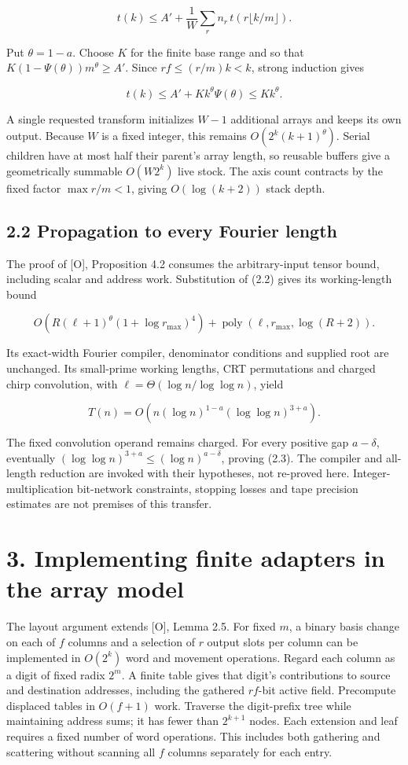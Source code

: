\documentclass[
  11pt,
]{article}
\begin{document}
\[t(k)\le A'+\frac1W\sum_r n_r\,t(r\lfloor k/m\rfloor).
\tag{2.5}\]

Put \(\theta=1-a\). Choose \(K\) for the finite base range and so that
\(K(1-\Psi(\theta))m^\theta\ge A'\). Since \(rf\le(r/m)k<k\), strong
induction gives

\[t(k)\le A'+K k^\theta\Psi(\theta)\le K k^\theta.\]

A single requested transform initializes \(W-1\) additional arrays and
keeps its own output. Because \(W\) is a fixed integer, this remains
\(O(2^k(k+1)^\theta)\). Serial children have at most half their parent's
array length, so reusable buffers give a geometrically summable
\(O(W2^k)\) live stock. The axis count contracts by the fixed factor
\(\max r/m<1\), giving \(O(\log(k+2))\) stack depth.

\subsection{2.2 Propagation to every Fourier
length}\label{propagation-to-every-fourier-length}

The proof of {[}O{]}, Proposition 4.2 consumes the arbitrary-input
tensor bound, including scalar and address work. Substitution of (2.2)
gives its working-length bound

\[O\!\left(R(\ell+1)^\theta(1+\log r_{\max})^4\right)
+\operatorname{poly}(\ell,r_{\max},\log(R+2)).\]

Its exact-width Fourier compiler, denominator conditions and supplied
root are unchanged. Its small-prime working lengths, CRT permutations
and charged chirp convolution, with \(\ell=\Theta(\log n/\log\log n)\),
yield

\[T(n)=O\!\left(n(\log n)^{1-a}(\log\log n)^{3+a}\right).
\tag{2.6}\]

The fixed convolution operand remains charged. For every positive gap
\(a-\delta\), eventually \((\log\log n)^{3+a}\le(\log n)^{a-\delta}\),
proving (2.3). The compiler and all-length reduction are invoked with
their hypotheses, not re-proved here. Integer-multiplication bit-network
constraints, stopping losses and tape precision estimates are not
premises of this transfer.

\section{3. Implementing finite adapters in the array
model}\label{implementing-finite-adapters-in-the-array-model}

The layout argument extends {[}O{]}, Lemma 2.5. For fixed \(m\), a
binary basis change on each of \(f\) columns and a selection of \(r\)
output slots per column can be implemented in \(O(2^k)\) word and
movement operations. Regard each column as a digit of fixed radix
\(2^m\). A finite table gives that digit's contributions to source and
destination addresses, including the gathered \(rf\)-bit active field.
Precompute displaced tables in \(O(f+1)\) work. Traverse the
digit-prefix tree while maintaining address sums; it has fewer than
\(2^{k+1}\) nodes. Each extension and leaf requires a fixed number of
word operations. This includes both gathering and scattering without
scanning all \(f\) columns separately for each entry.
\end{document}
